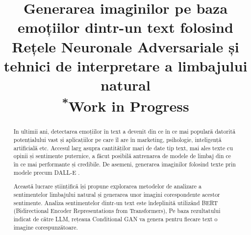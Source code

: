 \documentclass[conference]{IEEEtran}
\begin{document}
\title{Generarea imaginilor pe baza emoțiilor dintr-un text folosind Rețele Neuronale Adversariale și tehnici de interpretare a limbajului natural\\
{\footnotesize \textsuperscript{*}Work in Progress}
}

\author{
	\and{}
}



\maketitle
\begin{abstract}
	In ultimii ani, detectarea emoțiilor în text a devenit din ce în ce mai populară
	datorită potențialului vast și aplicațiilor pe care îl are în marketing,
	psihologie, inteligență artificială etc. Accesul larg asupra cantităților mari de date tip text,
	mai ales texte cu opinii și sentimente puternice,
	a făcut posibilă antrenarea de modele de limbaj din ce în ce mai performante și credibile.
	De asemeni, generarea imaginilor folosind texte prin modele precum DALL-E \cite{dalle}.

	Această lucrare științifică își propune explorarea metodelor de analizare a sentimentelor 
	limbajului natural și generarea unor imagini corespondente acestor sentimente. 
	Analiza sentimentelor dintr-un text este îndeplinită utilizând BERT (Bidirectional Encoder Representations from Transformers)\cite{devlin2019bert},
	Pe baza rezultatului indicat de către LLM, rețeaua Conditional GAN va genera pentru fiecare text o imagine corespunzătoare. 

	
\end{abstract}
\end{document}
